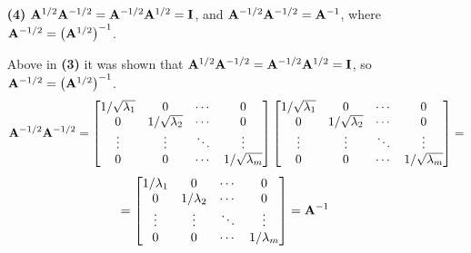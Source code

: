 \begin{enumerate}
            \item[\textbf{(4)}]{$\bold{A}^{1/2}\bold{A}^{-1/2} = \bold{A}^{-1/2}\bold{A}^{1/2} = \bold{I}$, and $\bold{A}^{-1/2}\bold{A}^{-1/2} = \bold{A}^{-1}$, where $\bold{A}^{-1/2} = {\left(\bold{A}^{1/2}\right)}^{-1}$.}
            \par
            Above in \textbf{(3)} it was shown that $\bold{A}^{1/2}\bold{A}^{-1/2} = \bold{A}^{-1/2}\bold{A}^{1/2} = \bold{I}$, so $\bold{A}^{-1/2} = {\left(\bold{A}^{1/2}\right)}^{-1}$.
            \[
                \bold{A}^{-1/2}\bold{A}^{-1/2} 
                = 
                \begin{bmatrix}
                    1/\sqrt{\lambda_1} & 0 & \cdots & 0 \\
                    0 & 1/\sqrt{\lambda_2} & \cdots & 0 \\
                    \vdots & \vdots & \ddots & \vdots \\
                    0 & 0 & \cdots & 1/\sqrt{\lambda_m}
                \end{bmatrix}
                \begin{bmatrix}
                    1/\sqrt{\lambda_1} & 0 & \cdots & 0 \\
                    0 & 1/\sqrt{\lambda_2} & \cdots & 0 \\
                    \vdots & \vdots & \ddots & \vdots \\
                    0 & 0 & \cdots & 1/\sqrt{\lambda_m}
                \end{bmatrix}
                =
            \]
            \[
                =
                \begin{bmatrix}
                    1/\lambda_1 & 0 & \cdots & 0 \\
                    0 & 1/\lambda_2 & \cdots & 0 \\
                    \vdots & \vdots & \ddots & \vdots \\
                    0 & 0 & \cdots & 1/\lambda_m
                \end{bmatrix}
                =
                \bold{A}^{-1}
            \]

        \end{enumerate}